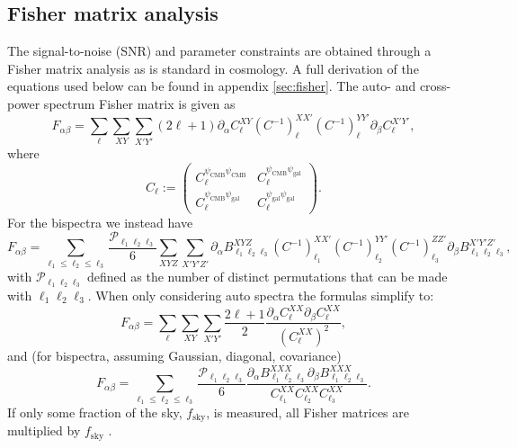 \documentclass[11pt]{article} %
\begin{document}
\subsection{Fisher matrix analysis}
The signal-to-noise (SNR) and parameter constraints are obtained through a Fisher matrix analysis as is standard in cosmology\cite{dodelson2020modern}. A full derivation of the equations used below can be found in appendix \ref{sec:fisher}. The auto- and cross- power spectrum Fisher matrix is given as
\begin{equation*}
    F_{\alpha\beta} = \sum_{\ell} \sum_{XY}\sum_{X'Y'}(2\ell+1)\partial_\alpha C_\ell^{XY} (C^{-1})_\ell^{XX'}(C^{-1})_\ell^{YY'} \partial_\beta C^{X'Y'}_\ell,
\end{equation*}
where
\begin{equation*}
    C_{\ell} := \begin{pmatrix}
        C^{\psi_{\text{CMB}}\psi_{\text{CMB}}}_\ell & C^{\psi_{\text{CMB}}\psi_{\text{gal}}}_\ell \\
        C^{\psi_{\text{CMB}}\psi_{\text{gal}}}_\ell & C^{\psi_{\text{gal}}\psi_{\text{gal}}}_\ell
    \end{pmatrix}.
\end{equation*}
For the bispectra we instead have 
\begin{equation*}
    F_{\alpha\beta} = \sum_{\ell_1 \leq \ell_2 \leq \ell_3} \frac{\mathcal P _{\ell_1\ell_2\ell_3}}{6}
    \sum_{XYZ}\sum_{X'Y'Z'} 
    \partial_\alpha B^{X Y Z}_{\ell_1 \ell_2 \ell_3} 
    (C^{-1})^{X X'}_{\ell_1}
    (C^{-1})^{Y Y'}_{\ell_2}
    (C^{-1})^{Z Z'}_{\ell_3}
    \partial_\beta B^{X' Y' Z'}_{\ell_1 \ell_2 \ell_3},
\end{equation*}
with $\mathcal P_{\ell_1\ell_2\ell_3}$ defined as the number of distinct permutations that can be made with $\ell_1\ell_2\ell_3$. When only considering auto spectra the formulas simplify to:
\begin{equation*}
    F_{\alpha\beta} = \sum_{\ell} \sum_{XY}\sum_{X'Y'}\frac{2\ell+1}{2}\frac{\partial_{\alpha}C_\ell^{XX} \partial_\beta C^{XX}_\ell}{(C_\ell^{XX})^2},
\end{equation*}
and (for bispectra, assuming Gaussian, diagonal, covariance)
\begin{equation*}
    F_{\alpha\beta} = \sum_{\ell_1 \leq \ell_2 \leq \ell_3} \frac{\mathcal P _{\ell_1\ell_2\ell_3}}{6}
    \frac{\partial_\alpha B^{X X X}_{\ell_1 \ell_2 \ell_3} 
    \partial_\beta B^{XXX}_{\ell_1 \ell_2 \ell_3}}{C^{XX}_{\ell_1}C^{XX}_{\ell_2}C^{XX}_{\ell_3}}.
\end{equation*}
If only some fraction of the sky, $f_{\text{sky}}$, is measured, all Fisher matrices are multiplied by $f_{\text{sky}}$ \cite{Takada2003}.
\end{document}
